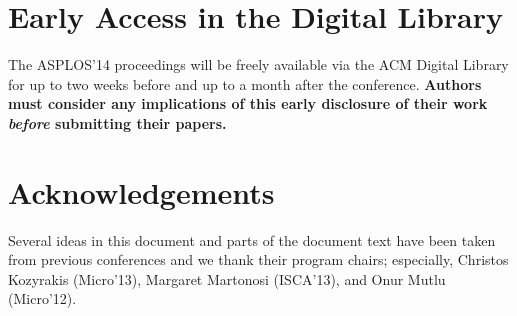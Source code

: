 \documentclass[pageno]{jpaper}
\begin{document}
\section{Early Access in the Digital Library}

The ASPLOS'14 proceedings will be freely available via the ACM Digital
Library for up to two weeks before and up to a month after the
conference. {\bf Authors must consider any implications of this early
disclosure of their work {\em before} submitting their papers.}


\section{Acknowledgements}
Several ideas in this document and parts of the document text have been
taken from previous conferences and we thank their program chairs;
especially, Christos Kozyrakis (Micro'13), Margaret Martonosi (ISCA'13),
and Onur Mutlu (Micro'12).



\end{document}
